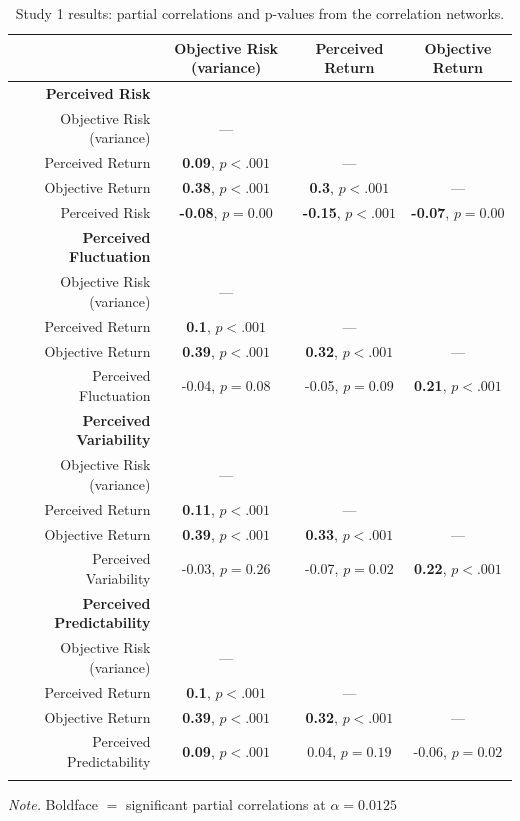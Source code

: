 \begin{table}[H]
\begin{center}
\begin{threeparttable}
\caption{\label{tab:study1_pcc}Study 1 results: partial correlations and p-values from the correlation networks.
\label{study1_pcc}}
\begin{tabular}{rccc}
\toprule
 & \multicolumn{1}{c}{Objective Risk (variance)} & \multicolumn{1}{c}{Perceived Return} & \multicolumn{1}{c}{Objective Return}\\
\midrule
\cmidrule{2-4} \textbf{ Perceived Risk } &  &  & \\
\ \ \ Objective Risk (variance) & --- &  & \\
\ \ \ Perceived Return & \textbf{0.09}, $p<.001$ & --- & \\
\ \ \ Objective Return & \textbf{0.38}, $p<.001$ & \textbf{0.3}, $p<.001$ & ---\\
\ \ \ Perceived Risk & \textbf{-0.08}, $ p= 0.00 $ & \textbf{-0.15}, $p<.001$ & \textbf{-0.07}, $ p= 0.00 $\\
\cmidrule{2-4} \textbf{ Perceived Fluctuation } &  &  & \\
\ \ \ Objective Risk (variance) & --- &  & \\
\ \ \ Perceived Return & \textbf{0.1}, $p<.001$ & --- & \\
\ \ \ Objective Return & \textbf{0.39}, $p<.001$ & \textbf{0.32}, $p<.001$ & ---\\
\ \ \ Perceived Fluctuation & -0.04, $ p= 0.08 $ & -0.05, $ p= 0.09 $ & \textbf{0.21}, $p<.001$\\
\cmidrule{2-4} \textbf{ Perceived Variability } &  &  & \\
\ \ \ Objective Risk (variance) & --- &  & \\
\ \ \ Perceived Return & \textbf{0.11}, $p<.001$ & --- & \\
\ \ \ Objective Return & \textbf{0.39}, $p<.001$ & \textbf{0.33}, $p<.001$ & ---\\
\ \ \ Perceived Variability & -0.03, $ p= 0.26 $ & -0.07, $ p= 0.02 $ & \textbf{0.22}, $p<.001$\\
\cmidrule{2-4} \textbf{ Perceived Predictability } &  &  & \\
\ \ \ Objective Risk (variance) & --- &  & \\
\ \ \ Perceived Return & \textbf{0.1}, $p<.001$ & --- & \\
\ \ \ Objective Return & \textbf{0.39}, $p<.001$ & \textbf{0.32}, $p<.001$ & ---\\
\ \ \ Perceived Predictability & \textbf{0.09}, $p<.001$ & 0.04, $ p= 0.19 $ & -0.06, $ p= 0.02 $\\
\bottomrule
\addlinespace
\end{tabular}
\begin{tablenotes}[para]
\normalsize{\textit{Note.} Boldface $=$ significant partial correlations at $\alpha= 0.0125 $}
\end{tablenotes}
\end{threeparttable}
\end{center}
\end{table}

